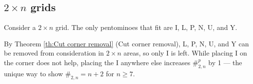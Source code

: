 \documentclass{article}
\theoremstyle{definition}%
\newtheorem{definition}[theorem]{Definition}
\newtheorem{example}[theorem]{Example}
\newcommand{\newterm}[1]{\textit{#1}}
\newcommand{\adj}{\operatorname{adj}}
\newcommand{\border}{\operatorname{border}}
\newcommand{\bound}{\operatorname{bound}}
\newcommand{\caves}{\operatorname{caves}}
\newcommand{\outside}{\operatorname{outside}}
\begin{document}
\subsection{\texorpdfstring{$2 \times n$}{2 \texttimes n} grids}

%
%
%
%
Consider a $2 \times n$ grid. The only pentominoes that fit are I, L, P, N, U, and Y.

By Theorem \ref{th:Cut corner removal} (Cut corner removal), L, P, N, U, and Y can be removed from consideration in $2 \times n$ areas, so only I is left. While placing I on the corner does not help, placing the I anywhere else increases $\#^p_{2, n}$ by 1 --- the unique way to show $\#_{2, n} = n + 2$ for $n \ge 7$.
\end{document}
